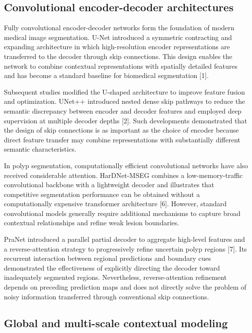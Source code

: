 \subsection{Convolutional encoder-decoder
architectures}\label{convolutional-encoder-decoder-architectures}

Fully convolutional encoder-decoder networks form the foundation of
modern medical image segmentation. U-Net introduced a symmetric
contracting and expanding architecture in which high-resolution encoder
representations are transferred to the decoder through skip connections.
This design enables the network to combine contextual representations
with spatially detailed features and has become a standard baseline for
biomedical segmentation {[}1{]}.

Subsequent studies modified the U-shaped architecture to improve feature
fusion and optimization. UNet++ introduced nested dense skip pathways to
reduce the semantic discrepancy between encoder and decoder features and
employed deep supervision at multiple decoder depths {[}2{]}. Such
developments demonstrated that the design of skip connections is as
important as the choice of encoder because direct feature transfer may
combine representations with substantially different semantic
characteristics.

In polyp segmentation, computationally efficient convolutional networks
have also received considerable attention. HarDNet-MSEG combines a
low-memory-traffic convolutional backbone with a lightweight decoder and
illustrates that competitive segmentation performance can be obtained
without a computationally expensive transformer architecture {[}6{]}.
However, standard convolutional models generally require additional
mechanisms to capture broad contextual relationships and refine weak
lesion boundaries.

PraNet introduced a parallel partial decoder to aggregate high-level
features and a reverse-attention strategy to progressively refine
uncertain polyp regions {[}7{]}. Its recurrent interaction between
regional predictions and boundary cues demonstrated the effectiveness of
explicitly directing the decoder toward inadequately segmented regions.
Nevertheless, reverse-attention refinement depends on preceding
prediction maps and does not directly solve the problem of noisy
information transferred through conventional skip connections.

\subsection{Global and multi-scale contextual
modeling}\label{global-and-multi-scale-contextual-modeling}

